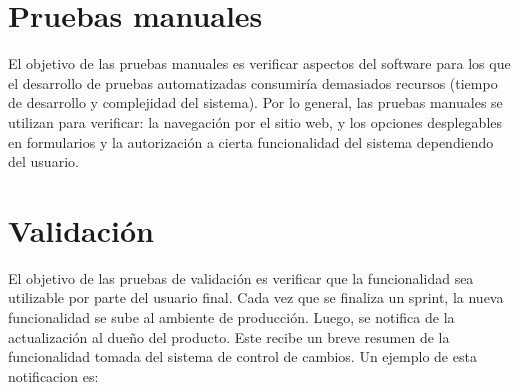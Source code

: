 \documentclass[letterpaper,10pt,spanish]{sphinxmanual}
\begin{document}
\section{Pruebas manuales}
\label{\detokenize{requerimientos/STPD:pruebas-manuales}}
El objetivo de las pruebas manuales es verificar aspectos del software
para los que el desarrollo de pruebas automatizadas consumiría demasiados
recursos (tiempo de desarrollo y complejidad del sistema). Por lo
general, las pruebas manuales se utilizan para verificar: la navegación
por el sitio web,  y los opciones desplegables en formularios y la
autorización a cierta funcionalidad del sistema dependiendo del usuario.


\section{Validación}
\label{\detokenize{requerimientos/STPD:validacion}}
El objetivo de las pruebas de validación es
verificar que la funcionalidad sea utilizable por parte del usuario
final. Cada vez que se finaliza un sprint, la nueva funcionalidad se
sube al ambiente de producción. Luego, se notifica de la actualización
al dueño del producto. Este recibe un breve resumen  de la funcionalidad tomada
del sistema de control de cambios. Un ejemplo de esta notificacion es:
\end{document}
